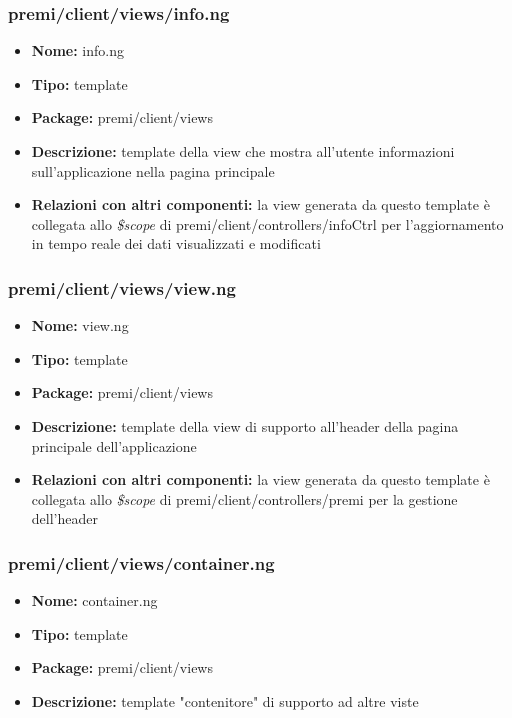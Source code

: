 \subsubsection{premi/client/views/info.ng}
\begin{itemize}
  \item[] \textbf{Nome:} info.ng
  \item[] \textbf{Tipo:} template
  \item[] \textbf{Package:} premi/client/views
  \item[] \textbf{Descrizione:} template della view che mostra all'utente informazioni sull'applicazione nella pagina principale
  \item[] \textbf{Relazioni con altri componenti:} la view generata da questo template è collegata allo \textit{\$scope} di premi/client/controllers/infoCtrl per l'aggiornamento in tempo reale dei dati visualizzati e modificati 
\end{itemize}


\subsubsection{premi/client/views/view.ng}
\begin{itemize}
  \item[] \textbf{Nome:} view.ng
  \item[] \textbf{Tipo:} template
  \item[] \textbf{Package:} premi/client/views
  \item[] \textbf{Descrizione:} template della view di supporto all'header della pagina principale dell'applicazione
  \item[] \textbf{Relazioni con altri componenti:} la view generata da questo template è collegata allo \textit{\$scope} di premi/client/controllers/premi per la gestione dell'header
\end{itemize}


\subsubsection{premi/client/views/container.ng}
\begin{itemize}
  \item[] \textbf{Nome:} container.ng
  \item[] \textbf{Tipo:} template
  \item[] \textbf{Package:} premi/client/views
  \item[] \textbf{Descrizione:} template "contenitore" di supporto ad altre viste
\end{itemize}
  
